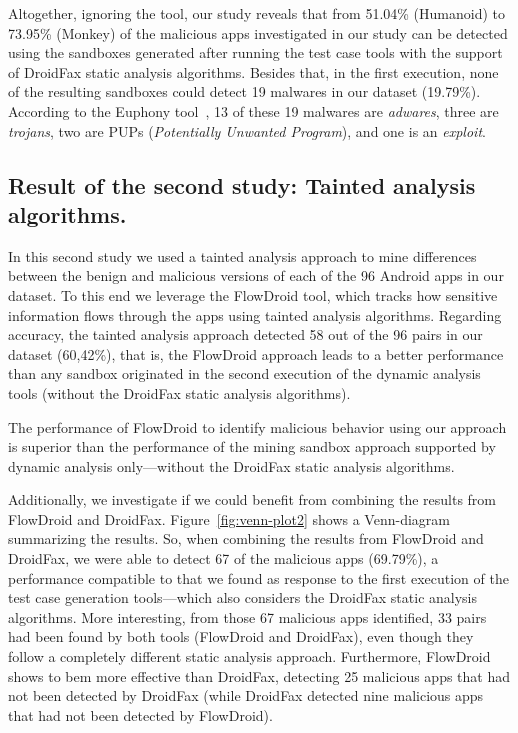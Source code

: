 Altogether, ignoring the \joke tool, our study reveals that from 51.04\% (Humanoid)
to 73.95\% (Monkey) of the malicious apps investigated in our study can be
detected using the sandboxes generated after running the test case tools with the support of DroidFax static analysis algorithms. Besides that, in the first execution, none of the resulting sandboxes could detect 19 malwares in our dataset (19.79\%). According to the Euphony tool~\cite{hurier2017euphony}, 13 of these 19 malwares are \emph{adwares}, three are \emph{trojans}, two are PUPs (\emph{Potentially Unwanted Program}), and one is an \emph{exploit}. 




\subsection{Result of the second study: Tainted analysis algorithms.}\label{sec:res-ss}

In this second study we used a tainted analysis approach to mine differences between the benign and malicious versions of each of the 96 Android apps in our dataset. To this end we leverage the FlowDroid tool, which tracks how sensitive information flows through the apps using tainted analysis algorithms. Regarding accuracy, the tainted analysis approach detected 58 out of the 96 pairs in our dataset (60,42\%), that is, the FlowDroid approach leads to a better performance than any sandbox originated in the second execution of the dynamic analysis tools (without the DroidFax static analysis algorithms).

\begin{finding}
  The performance of FlowDroid to identify malicious behavior
  using our approach is superior than the performance of the
  mining sandbox approach supported by dynamic analysis only---without
  the DroidFax static analysis algorithms.
\end{finding}

Additionally, we investigate if we could benefit from combining
the results from FlowDroid and DroidFax. Figure~\ref{fig:venn-plot2} shows a
Venn-diagram summarizing the results. So, when combining
the results from FlowDroid and DroidFax, we were able to detect
67 of the malicious apps (69.79\%), a performance compatible
to that we found as response to the first execution of the
test case generation tools---which also considers the DroidFax
static analysis algorithms. More interesting, from those 67
malicious apps identified, 33 pairs had been found by
both tools (FlowDroid and DroidFax), even though they follow
a completely different static analysis approach. Furthermore,
FlowDroid shows to bem more effective than DroidFax, detecting 25 malicious
apps that had not been detected by DroidFax (while DroidFax detected nine
malicious apps that had not been detected by FlowDroid).

